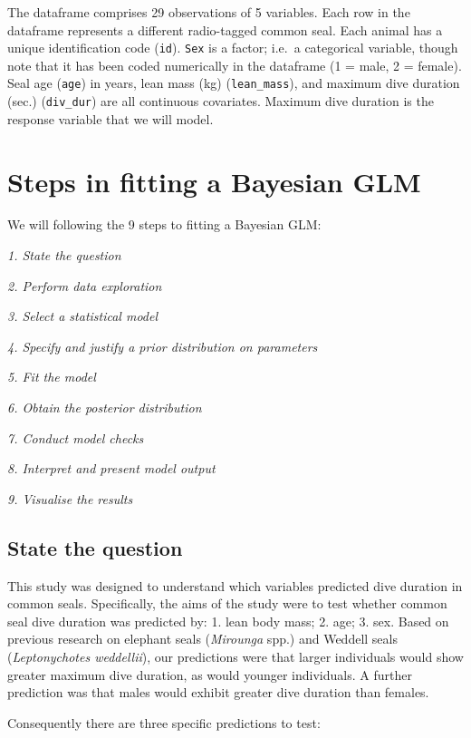 \documentclass[
]{book}
\begin{document}
The dataframe comprises 29 observations of 5 variables. Each row in the dataframe represents a different radio-tagged common seal. Each animal has a unique identification code (\texttt{id}). \texttt{Sex} is a factor; i.e.~a categorical variable, though note that it has been coded numerically in the dataframe (1 = male, 2 = female). Seal age (\texttt{age}) in years, lean mass (kg) (\texttt{lean\_mass}), and maximum dive duration (sec.) (\texttt{div\_dur}) are all continuous covariates. Maximum dive duration is the response variable that we will model.

\hypertarget{gamma-glm-steps}{%
\section{Steps in fitting a Bayesian GLM}\label{gamma-glm-steps}}

We will following the 9 steps to fitting a Bayesian GLM:

\emph{1. State the question}

\emph{2. Perform data exploration}

\emph{3. Select a statistical model}

\emph{4. Specify and justify a prior distribution on parameters}

\emph{5. Fit the model}

\emph{6. Obtain the posterior distribution}

\emph{7. Conduct model checks}

\emph{8. Interpret and present model output}

\emph{9. Visualise the results}

\hypertarget{seal-question}{%
\subsection{State the question}\label{seal-question}}

This study was designed to understand which variables predicted dive duration in common seals. Specifically, the aims of the study were to test whether common seal dive duration was predicted by: 1. lean body mass; 2. age; 3. sex. Based on previous research on elephant seals (\emph{Mirounga} spp.) and Weddell seals (\emph{Leptonychotes weddellii}), our predictions were that larger individuals would show greater maximum dive duration, as would younger individuals. A further prediction was that males would exhibit greater dive duration than females.

Consequently there are three specific predictions to test:
\end{document}
